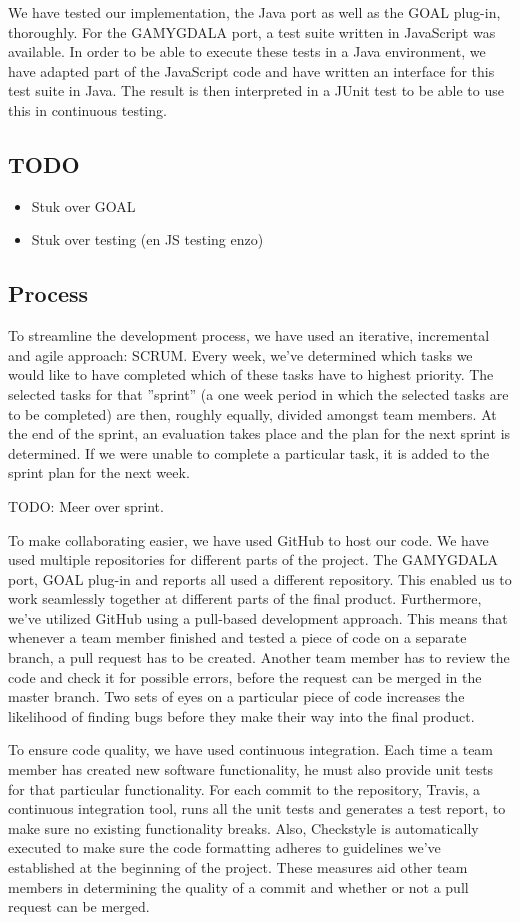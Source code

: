 We have tested our implementation, the Java port as well as the GOAL plug-in, thoroughly. For the GAMYGDALA port, a test suite written in JavaScript was available. In order to be able to execute these tests in a Java environment, we have adapted part of the JavaScript code and have written an interface for this test suite in Java. The result is then interpreted in a JUnit test to be able to use this in continuous testing.

\subsection*{TODO}
\begin{itemize}
\item Stuk over GOAL
\item Stuk over testing (en JS testing enzo)
\end{itemize}

\subsection{Process}
To streamline the development process, we have used an iterative, incremental and agile approach: SCRUM. Every week, we've determined which tasks we would like to have completed which of these tasks have to highest priority. The selected tasks for that ''sprint'' (a one week period in which the selected tasks are to be completed) are then, roughly equally, divided amongst team members. At the end of the sprint, an evaluation takes place and the plan for the next sprint is determined. If we were unable to complete a particular task, it is added to the sprint plan for the next week.

TODO: Meer over sprint.

To make collaborating easier, we have used GitHub to host our code. We have used multiple repositories for different parts of the project. The GAMYGDALA port, GOAL plug-in and reports all used a different repository. This enabled us to work seamlessly together at different parts of the final product. Furthermore, we've utilized GitHub using a pull-based development approach. This means that whenever a team member finished and tested a piece of code on a separate branch, a pull request has to be created. Another team member has to review the code and check it for possible errors, before the request can be merged in the master branch. Two sets of eyes on a particular piece of code increases the likelihood of finding bugs before they make their way into the final product. 

To ensure code quality, we have used continuous integration. Each time a team member has created new software functionality, he must also provide unit tests for that particular functionality. For each commit to the repository, Travis, a continuous integration tool, runs all the unit tests and generates a test report, to make sure no existing functionality breaks. Also, Checkstyle is automatically executed to make sure the code formatting adheres to guidelines we've established at the beginning of the project. These measures aid other team members in determining the quality of a commit and whether or not a pull request can be merged.